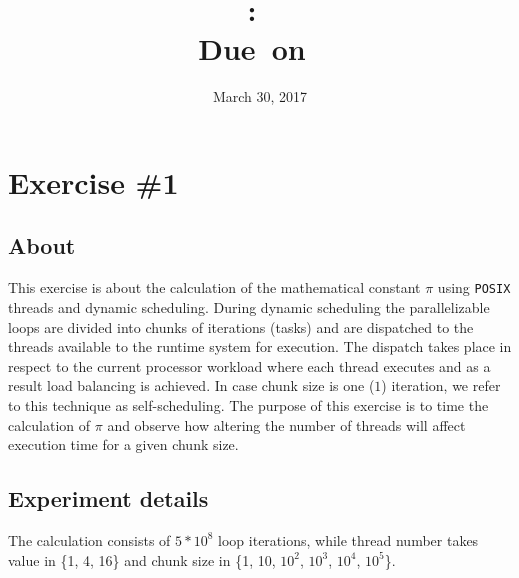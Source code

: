 \documentclass{article}
\title{
\vspace{2in}
\textmd{\textbf{\hmwkClass:\ \hmwkTitle}}\\
\normalsize\vspace{0.1in}\small{Due\ on\ \hmwkDueDate}\\
\vspace{0.1in}\large{\textit{\hmwkClassInstructor}}
\vspace{3in}
}
\author{\textbf{\hmwkAuthorName}}
\date{March 30, 2017} %
\begin{document}
\maketitle


\newpage
\tableofcontents
\newpage



\section{Exercise \#1}

\subsection{About}
This exercise is about the calculation of the mathematical constant $\pi$ using \texttt{POSIX}
threads and dynamic scheduling. During dynamic scheduling the parallelizable loops are divided
into chunks of iterations (tasks) and are dispatched to the threads available to the runtime
system for execution. The dispatch takes place in respect to the current processor workload
where each thread executes and as a result load balancing is achieved. In case chunk size is
one ($1$) iteration, we refer to this technique as self-scheduling. The purpose of this
exercise is to time the calculation of $\pi$ and observe how altering the number of threads
will affect execution time for a given chunk size.

\subsection{Experiment details}
The calculation consists of $5*10^8$ loop iterations, while thread number takes value in \{1, 4, 16\} and
chunk size in \{1, 10, $10^2$, $10^3$, $10^4$, $10^5$\}.
\end{document}

